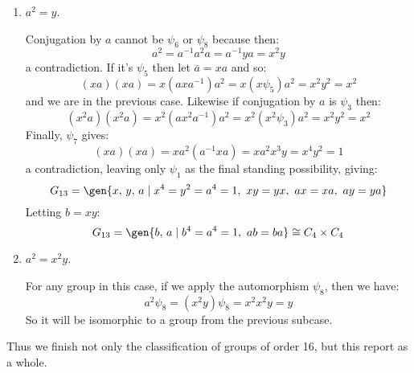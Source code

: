 \begin{enumerate}
\begin{enumerate}[\bfseries A:]
            \item \(a^2 = y\).

                Conjugation by \(a\) cannot be \(\psi_6\) or \(\psi_8\) because then:
                \[a^2 = a^{-1}a^2 a = a^{-1}ya = x^2 y\]
                a contradiction.
                If it's \(\psi_5\) then let \(\bar{a} = xa\) and so:
                \[(xa)(xa) = x(axa^{-1})a^2 = x(x\psi_5)a^2 = x^2 y^2 = x^2\]
                and we are in the previous case.
                Likewise if conjugation by \(a\) is \(\psi_3\) then:
                \[(x^2 a)(x^2 a) = x^2(ax^2 a^{-1})a^2 = x^2(x^2\psi_3)a^2 = x^2 y^2 = x^2\]
                Finally, \(\psi_7\) gives:
                \[(xa)(xa) = xa^2(a^{-1}xa) = xa^2 x^3 y = x^4 y^2 = 1\]
                a contradiction, leaving only \(\psi_1\) as the final standing possibility, giving:
                \[G_{13} = \gen{x,\,y,\,a \mid x^4 = y^2 = a^4 = 1,\ xy = yx,\ ax = xa,\ ay = ya}\]
                Letting \(b = xy\):
                \[G_{13} = \gen{b,\,a \mid b^4 = a^4 = 1,\ ab = ba} \cong C_4 \times C_4\]

            \item \(a^2 = x^2 y\).

                For any group in this case, if we apply the automorphism \(\psi_8\), then we have:
                \[a^2\psi_8 = (x^2 y)\psi_8 = x^2 x^2 y = y\]
                So it will be isomorphic to a group from the previous subcase.

        \end{enumerate}
\end{enumerate}
Thus we finish not only the classification of groups of order 16, but this report as a whole.
